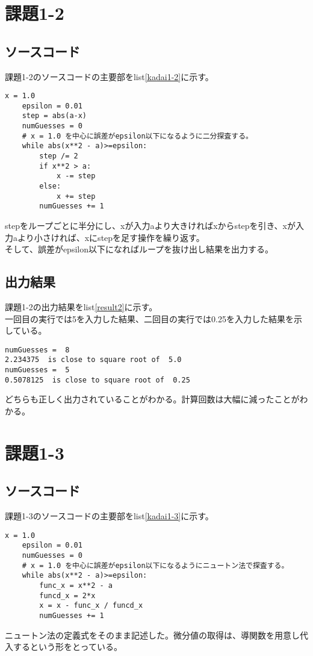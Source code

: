 \documentclass[a4paper]{ltjsarticle}
\begin{document}
\section*{課題1-2}
\subsection*{ソースコード}
課題1-2のソースコードの主要部をlist\ref{kadai1-2}に示す。
\begin{lstlisting}[caption=kadai1-2.py,label=kadai1-2]
    x = 1.0
    epsilon = 0.01
    step = abs(a-x)
    numGuesses = 0
    # x = 1.0 を中心に誤差がepsilon以下になるように二分探査する。
    while abs(x**2 - a)>=epsilon:
        step /= 2
        if x**2 > a:
            x -= step
        else:
            x += step
        numGuesses += 1
\end{lstlisting}
stepをループごとに半分にし、xが入力aより大きければxからstepを引き、xが入力aより小さければ、xにstepを足す操作を繰り返す。
\\そして、誤差がepsilon以下になればループを抜け出し結果を出力する。

\subsection*{出力結果}
課題1-2の出力結果をlist\ref{result2}に示す。
\\一回目の実行では5を入力した結果、二回目の実行では0.25を入力した結果を示している。
\begin{lstlisting}[caption=output, label=result2]
numGuesses =  8
2.234375  is close to square root of  5.0
numGuesses =  5
0.5078125  is close to square root of  0.25
\end{lstlisting}
どちらも正しく出力されていることがわかる。計算回数は大幅に減ったことがわかる。
\newpage

\section*{課題1-3}
\subsection*{ソースコード}
課題1-3のソースコードの主要部をlist\ref{kadai1-3}に示す。
\begin{lstlisting}[caption=kadai1-3.py,label=kadai1-3]
    x = 1.0
    epsilon = 0.01
    numGuesses = 0
    # x = 1.0 を中心に誤差がepsilon以下になるようにニュートン法で探査する。
    while abs(x**2 - a)>=epsilon:
        func_x = x**2 - a
        funcd_x = 2*x
        x = x - func_x / funcd_x
        numGuesses += 1
\end{lstlisting}
ニュートン法の定義式をそのまま記述した。微分値の取得は、導関数を用意し代入するという形をとっている。
\end{document}
